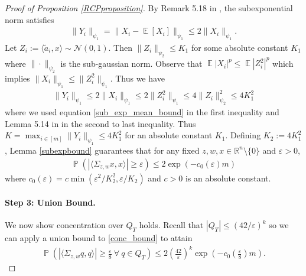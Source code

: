 \documentclass[11pt]{article}
\renewcommand{\epsilon}{\varepsilon}
\newcommand{\R}{\mathbb{R}}
\newcommand{\E}{\operatorname{\mathbb{E}}}
\newcommand{\Pro}{\operatorname{\mathbb{P}}}
\theoremstyle{remark}
\begin{document}
\begin{proof}[Proof of Proposition \ref{RCPproposition}]
By Remark 5.18 in \cite{Vershynin_notes}, the subexponential norm satisfies \begin{align}
    \|Y_i\|_{\psi_1} = \|X_i - \E[X_i]\|_{\psi_1} \leqslant 2\|X_i\|_{\psi_{1}}. \label{sub_exp_mean_bound}
\end{align} Let $Z_i := \langle \tilde{a}_i,x\rangle \sim \mathcal{N}(0,1)$.  Then $\|Z_i\|_{\psi_2} \leqslant K_1$ for some absolute constant $K_1$ where $\|\cdot\|_{\psi_2}$ is the sub-gaussian norm. Observe that $\E|X_i|^p \leqslant \E|Z_i^2|^p$ which implies $\|X_i\|_{\psi_1} \leqslant \|Z_i^2\|_{\psi_1}$. Thus we have \begin{align*}
    \|Y_i\|_{\psi_1} \leqslant 2\|X_i\|_{\psi_1} \leqslant 2\|Z_i^2\|_{\psi_1} \leqslant 4\|Z_i\|^2_{\psi_2} \leqslant 4K_1^2
\end{align*} where we used equation \eqref{sub_exp_mean_bound} in the first inequality and Lemma 5.14 in \cite{Vershynin_notes} in the second to last inequality. Thus $K =\max_{i \in [m]} \|Y_i\|_{\psi_1} \leqslant 4K_1^2$ for an absolute constant $K_1$. Defining $K_2 := 4K_1^2$, Lemma \ref{subexpbound} guarantees that for any fixed $z,w,x \in \R^n \setminus \{0\}$ and $\epsilon > 0$, \begin{align}
\Pro\left(|\langle \Sigma_{z,w} x,x \rangle| \geqslant \epsilon\right) \leqslant 2\exp(-c_0(\epsilon) m) \label{conc_bound}
\end{align} where $c_0(\epsilon) = c \min(\epsilon^2/K_2^2,\epsilon/K_2)$ and $c > 0$ is an absolute constant.

\paragraph{Step 3: Union Bound.} We now show concentration over $Q_T$ holds. Recall that $|Q_T| \leqslant (42/\epsilon)^{k}$ so we can apply a union bound to \eqref{conc_bound} to attain \begin{align} \label{qbound}
\Pro\left(|\langle \Sigma_{z,w} q,q \rangle| \geqslant \frac{\epsilon}{8}\ \forall\ q \in Q_T\right) \leqslant 2 \left(\frac{42}{\epsilon}\right)^k\exp\left(-c_0\left(\frac{\epsilon}{8}\right)m\right).
\end{align} 


\end{proof}
\end{document}
